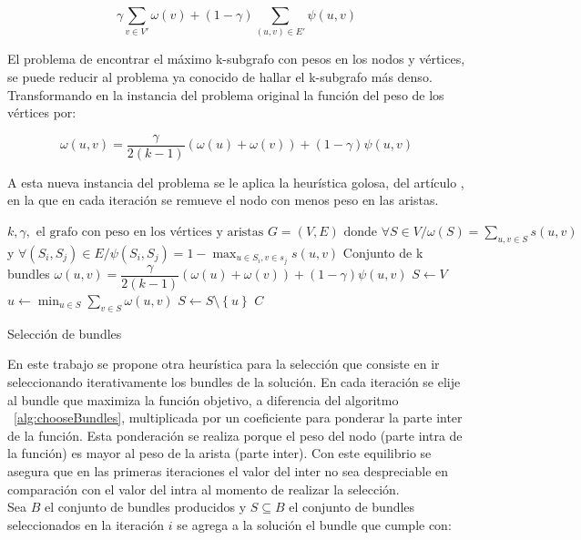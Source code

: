 \begin{equation}
\gamma \sum_{v \in V'}{\omega(v)} + (1 - \gamma) \sum_{(u,v) \in E'}{\psi(u,v)}
\end{equation}

El problema de encontrar el máximo k-subgrafo con pesos en los nodos y vértices, se puede reducir al problema ya conocido de hallar el k-subgrafo más denso\cite{SubgraphProblem}. Transformando en la instancia del problema original la función del peso de los vértices por:
 
\begin{equation}
\omega(u,v) = \dfrac{\gamma}{2( k - 1)} (\omega(u) + \omega(v)) + (1 - \gamma)\psi(u,v) 
\end{equation}

A esta nueva instancia del problema se le aplica la heurística golosa, del artículo \cite{compositeRetrival}, en la que en cada iteración se remueve el nodo con menos peso en las aristas.\\

\begin{algorithm}[H]
\begin{algorithmic}[1]
\REQUIRE $k,\gamma,\text{ el grafo con peso en los vértices y aristas }G=(V,E) \text{ donde }\forall S \in V / \omega(S) = \sum_{u,v \in S}{s(u,v)}$ y $\forall (S_i,S_j) \in E / \psi(S_i,S_j) = 1 - \max_{u \in S_i, v \in s_j}{s(u,v)}$
\ENSURE Conjunto de k bundles
\STATE $\omega(u,v) = \dfrac{\gamma}{2( k - 1)} (\omega(u) + \omega(v)) + (1 - \gamma)\psi(u,v)$
\STATE $S \leftarrow V$
\STATE $u \leftarrow \min_{u \in S}{\sum_{v \in S}{\omega(u,v)}}$
\STATE $S \leftarrow S \setminus  \left\{u\right\} $
\ENDWHILE
\RETURN $C$
\end{algorithmic}
\caption{Selección de bundles}\label{alg:chooseBundles}
\end{algorithm}

En este trabajo se propone otra heurística para la selección que consiste en ir seleccionando iterativamente los bundles de la solución. En cada iteración se elije al bundle que maximiza la función objetivo, a diferencia del algoritmo ~\ref{alg:chooseBundles}, multiplicada por un coeficiente para ponderar la parte inter de la función. Esta ponderación se realiza porque el peso del nodo (parte intra de la función) es mayor al peso de la arista (parte inter). Con este equilibrio se asegura que en las primeras iteraciones el valor del inter no sea despreciable en comparación con el valor del intra al momento de realizar la selección.\\
Sea $B$ el conjunto de bundles producidos y $S \subseteq B$ el conjunto de bundles seleccionados en la iteración $i$ se agrega a la solución el bundle que cumple con:

